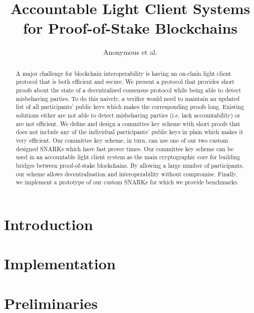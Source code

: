 \documentclass[runningheads]{llncs}
\begin{document}
\title{Accountable Light Client Systems for Proof-of-Stake Blockchains}
\author{Anonymous et al.}  
\maketitle

\begin{abstract} A major challenge for blockchain interoperability is having an on-chain light client protocol that is both efficient 
and secure. We present a protocol that provides short proofs about the state of a decentralised consensus protocol while being 
able to detect misbehaving parties. To do this naively, a verifier would need to maintain an updated list of all participants' public 
keys which makes the corresponding proofs long. Existing solutions either are not able to detect misbehaving parties (i.e. lack 
accountability) or are not efficient. We define and design a committee key scheme with short proofs that does not include any 
of the individual participants' public keys in plain which makes it very efficient. Our committee key scheme, in turn, can use 
one of our two custom designed SNARKs which have fast prover times. Our committee key scheme can be used in an 
accountable light client system as the main cryptographic core for building bridges between proof-of-stake blockchains. 
By allowing a large number of participants, our scheme allows decentralisation and interoperability without compromise. 
Finally, we implement a prototype of our custom SNARKs for which we provide benchmarks.

\end{abstract}


\section{Introduction} \label{sec_intro}


\section{Implementation} \label{sec_implementation}
%


\section{Preliminaries} \label{sec_prelims}



%





\end{document}
